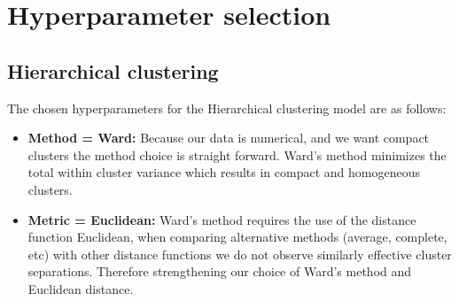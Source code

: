 \section{Hyperparameter selection}

\subsection{Hierarchical clustering}

The chosen hyperparameters for the Hierarchical clustering model are as follows:

\begin{itemize}
    \item \textbf{Method = Ward:} Because our data is numerical, and we want compact clusters the method choice is straight forward. Ward's method minimizes the total within cluster variance which results in compact and homogeneous clusters.
    
    \item \textbf{Metric = Euclidean:} Ward's method requires the use of the distance function Euclidean, when comparing alternative methods (average, complete, etc) with other distance functions we do not observe similarly effective cluster separations. Therefore strengthening our choice of Ward's method and Euclidean distance.
\end{itemize}